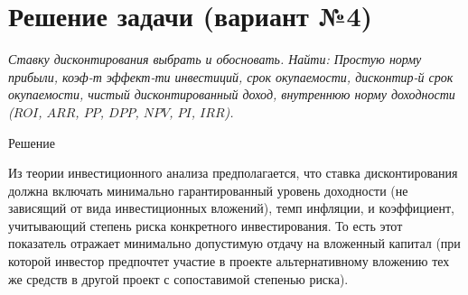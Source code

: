 \section{Решение задачи (вариант №4)}

\begin{table}[!ht]
\end{table}

\textit{Ставку дисконтирования выбрать и обосновать.
	Найти: Простую норму прибыли, коэф-т эффект-ти инвестиций, срок окупаемости, дисконтир-й срок окупаемости, чистый дисконтированный доход, внутреннюю норму доходности ($ROI$, $ARR$, $PP$, $DPP$, $NPV$, $PI$, $IRR$).}

\begin{center}
	Решение
\end{center}

Из теории инвестиционного анализа предполагается, что ставка дисконтирования должна включать минимально гарантированный уровень доходности (не зависящий от вида инвестиционных вложений), темп инфляции, и коэффициент, учитывающий степень риска конкретного инвестирования. То есть этот показатель отражает минимально допустимую отдачу на вложенный капитал (при которой инвестор предпочтет участие в проекте альтернативному вложению тех же средств в другой проект с сопоставимой степенью риска).


